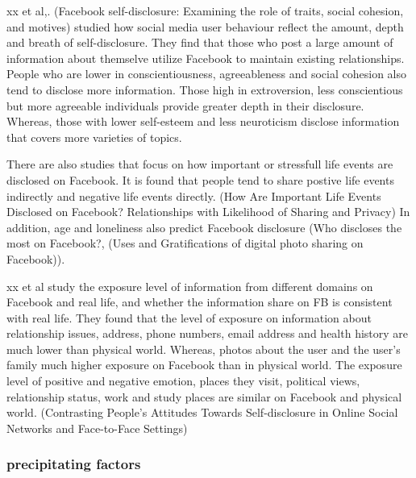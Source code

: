 xx et al,. (Facebook self-disclosure: Examining the role of traits, social cohesion, and motives) studied how social media user behaviour reflect the amount, depth and breath of self-disclosure. They find that those who post a large amount of information about themselve utilize Facebook to maintain existing relationships.
 People who are lower in conscientiousness, agreeableness and social cohesion also tend to disclose more information. Those high in extroversion, less conscientious but more agreeable individuals provide greater depth in their disclosure. Whereas, those with lower self-esteem and less neuroticism disclose information that covers more varieties of topics.


There are also studies that focus on how important or stressfull life events are disclosed on Facebook. It is found that people tend to share postive life events indirectly and negative life events directly.
(How Are Important Life Events Disclosed on Facebook? Relationships with Likelihood of Sharing and Privacy) In addition, age and loneliness also predict Facebook disclosure (Who discloses the most on Facebook?, (Uses and Gratifications of digital photo sharing on Facebook)).

xx et al study the exposure level of information from different domains on Facebook and real life, and whether the information share on FB is consistent with real life. They found that the level of exposure on information about relationship issues, address, phone numbers, email address and health history are much lower than physical world. Whereas, photos about the user and the user's family much higher exposure on Facebook than in physical world. The exposure level of positive and negative emotion, places they visit, political views, relationship status, work and study places are similar on Facebook and physical world. (Contrasting People’s Attitudes Towards Self-disclosure in Online Social Networks and Face-to-Face Settings) 


\subsubsection{precipitating factors}



